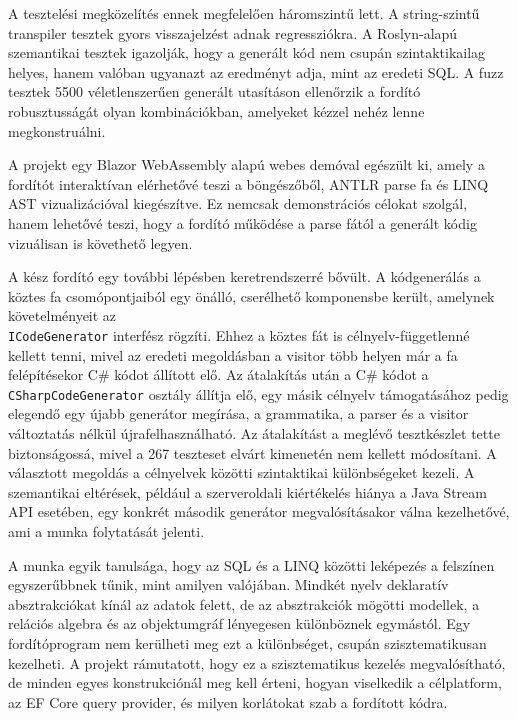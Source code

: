 A tesztelési megközelítés ennek megfelelően háromszintű lett. A string-szintű transpiler tesztek gyors visszajelzést adnak regressziókra. A Roslyn-alapú szemantikai tesztek igazolják, hogy a generált kód nem csupán szintaktikailag helyes, hanem valóban ugyanazt az eredményt adja, mint az eredeti SQL. A fuzz tesztek 5500 véletlenszerűen generált utasításon ellenőrzik a fordító robusztusságát olyan kombinációkban, amelyeket kézzel nehéz lenne megkonstruálni.

A projekt egy Blazor WebAssembly alapú webes demóval egészült ki, amely a fordítót interaktívan elérhetővé teszi a böngészőből, ANTLR parse fa és LINQ AST vizualizációval kiegészítve. Ez nemcsak demonstrációs célokat szolgál, hanem lehetővé teszi, hogy a fordító működése a parse fától a generált kódig vizuálisan is követhető legyen.

A kész fordító egy további lépésben keretrendszerré bővült. A kódgenerálás a köztes fa csomópontjaiból egy önálló, cserélhető komponensbe került, amelynek követelményeit az \\ \texttt{ICodeGenerator} interfész rögzíti. Ehhez a köztes fát is célnyelv-függetlenné kellett tenni, mivel az eredeti megoldásban a visitor több helyen már a fa felépítésekor C\# kódot állított elő. Az átalakítás után a C\# kódot a \texttt{CSharpCodeGenerator} osztály állítja elő, egy másik célnyelv támogatásához pedig elegendő egy újabb generátor megírása, a grammatika, a parser és a visitor változtatás nélkül újrafelhasználható. Az átalakítást a meglévő tesztkészlet tette biztonságossá, mivel a 267 teszteset elvárt kimenetén nem kellett módosítani. A választott megoldás a célnyelvek közötti szintaktikai különbségeket kezeli. A szemantikai eltérések, például a szerveroldali kiértékelés hiánya a Java Stream API esetében, egy konkrét második generátor megvalósításakor válna kezelhetővé, ami a munka folytatását jelenti.

A munka egyik tanulsága, hogy az SQL és a LINQ közötti leképezés a felszínen egyszerűbbnek tűnik, mint amilyen valójában. Mindkét nyelv deklaratív absztrakciókat kínál az adatok felett, de az absztrakciók mögötti modellek, a relációs algebra és az objektumgráf lényegesen különböznek egymástól. Egy fordítóprogram nem kerülheti meg ezt a különbséget, csupán szisztematikusan kezelheti. A projekt rámutatott, hogy ez a szisztematikus kezelés megvalósítható, de minden egyes konstrukciónál meg kell érteni, hogyan viselkedik a célplatform, az EF Core query provider, és milyen korlátokat szab a fordított kódra.
